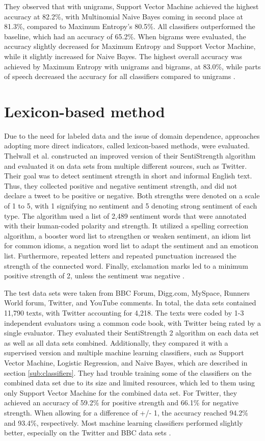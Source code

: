 They observed that with unigrams, Support Vector Machine achieved the highest accuracy at 82.2\%, with Multinomial Naive Bayes coming in second place at 81.3\%, compared to Maximum Entropy's 80.5\%. All classifiers outperformed the baseline, which had an accuracy of 65.2\%. When bigrams were evaluated, the accuracy slightly decreased for Maximum Entropy and Support Vector Machine, while it slightly increased for Naive Bayes. The highest overall accuracy was achieved by Maximum Entropy with unigrams and bigrams, at 83.0\%, while parts of speech decreased the accuracy for all classifiers compared to unigrams \cite{GoBHaHua2009}. 

\section{Lexicon-based method}

Due to the need for labeled data and the issue of domain dependence, approaches adopting more direct indicators, called lexicon-based methods, were evaluated. Thelwall et al. constructed an improved version of their SentiStrength algorithm and evaluated it on data sets from multiple different sources, such as Twitter. Their goal was to detect sentiment strength in short and informal English text. Thus, they collected positive and negative sentiment strength, and did not declare a tweet to be positive or negative. Both strengths were denoted on a scale of 1 to 5, with 1 signifying no sentiment and 5 denoting strong sentiment of each type. The algorithm used a list of 2,489 sentiment words that were annotated with their human-coded polarity and strength. It utilized a spelling correction algorithm, a booster word list to strengthen or weaken sentiment, an idiom list for common idioms, a negation word list to adapt the sentiment and an emoticon list. Furthermore, repeated letters and repeated punctuation increased the strength of the connected word. Finally, exclamation marks led to a minimum positive strength of 2, unless the sentiment was negative \cite{10.1002/asi.21662}.

The test data sets were taken from BBC Forum, Digg.com, MySpace, Runners World forum, Twitter, and YouTube comments. In total, the data sets contained 11,790 texts, with Twitter accounting for 4,218. The texts were coded by 1-3 independent evaluators using a common code book, with Twitter being rated by a single evaluator. They evaluated their SentiStrength 2 algorithm on each data set as well as all data sets combined. Additionally, they compared it with a supervised version and multiple machine learning classifiers, such as Support Vector Machine, Logistic Regression, and Naive Bayes, which are described in section \ref{sub:classifiers}. They had trouble training some of the classifiers on the combined data set due to its size and limited resources, which led to them using only Support Vector Machine for the combined data set. For Twitter, they achieved an accuracy of 59.2\% for positive strength and 66.1\% for negative strength. When allowing for a difference of +/- 1, the accuracy reached 94.2\% and 93.4\%, respectively. Most machine learning classifiers performed slightly better, especially on the Twitter and BBC data sets \cite{10.1002/asi.21662}.


